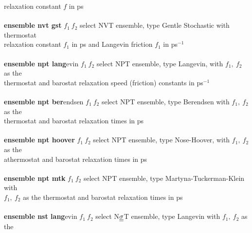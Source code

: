 \begin{tabbing}
\>                                              \> relaxation constant $f$ in ps \\
\>                                              \> \\
\> {\bf ensemble nvt gst} $f_{1}~f_{2}$         \> select NVT ensemble, type Gentle Stochastic with thermostat \\
\>                                              \> relaxation constant $f_{1}$ in ps and Langevin friction $f_{1}$ in ps$^{-1}$ \\
\>                                              \> \\
\> {\bf ensemble npt lang}evin $f_{1}~f_{2}$    \> select NPT ensemble, type Langevin, with $f_{1},~f_{2}$ as the \\
\>                                              \> thermostat and barostat relaxation speed (friction) constants in ps$^{-1}$ \\
\>                                              \> \\
\> {\bf ensemble npt ber}endsen $f_{1}~f_{2}$   \> select NPT ensemble, type Berendsen with $f_{1},~f_{2}$ as the \\
\>                                              \> thermostat and barostat relaxation times in ps \\
\>                                              \> \\
\> {\bf ensemble npt hoover} $f_{1}~f_{2}$      \> select NPT ensemble, type Nose-Hoover, with $f_{1},~f_{2}$ as the \\
\>                                              \> athermostat and barostat relaxation times in ps \\
\>                                              \> \\
\> {\bf ensemble npt mtk} $f_{1}~f_{2}$         \> select NPT ensemble, type Martyna-Tuckerman-Klein with \\
\>                                              \> $f_{1},~f_{2}$ as the thermostat and barostat relaxation times in ps \\
\>                                              \> \\
\> {\bf ensemble nst lang}evin $f_{1}~f_{2}$    \> select N$\mbox{$\underline{\underline{\bf \sigma}}$}$T ensemble, type Langevin with $f_{1},~f_{2}$ as the \\

\end{tabbing}
